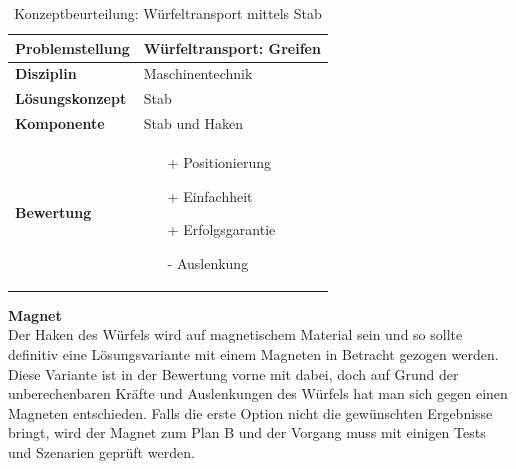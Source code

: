 \documentclass[../../main.tex]{subfiles}
\begin{document}
\begin{flushleft}
    \begin{table}[h]
    \begin{tabular}{ | l | p{11cm} |}
    \hline
    \textbf{Problemstellung} & Würfeltransport: Greifen \\ \hline
    \textbf{Disziplin} & Maschinentechnik \\ \hline
    \textbf{Lösungskonzept} &  Stab \\ \hline
    \textbf{Komponente} & Stab und Haken \\ \hline
    \textbf{Bewertung} &  \begin{itemize}
                            \item[+] Positionierung
                            \item[+] Einfachheit
                            \item[+] Erfolgsgarantie 
                            \item[-] Auslenkung
                          \end{itemize} \\ \hline
    \end{tabular}
    \caption{Konzeptbeurteilung: Würfeltransport mittels Stab}
    \label{tab:stab}
\end{table}
\end{flushleft}

\textbf{Magnet}\\
 Der Haken des Würfels wird auf magnetischem Material sein und so sollte definitiv eine Lösungsvariante mit einem Magneten in Betracht gezogen werden. Diese Variante ist in der Bewertung vorne mit dabei, doch auf Grund der unberechenbaren Kräfte und Auslenkungen des Würfels hat man sich gegen einen Magneten entschieden. Falls die erste Option nicht die gewünschten Ergebnisse bringt, wird der Magnet zum Plan B und der Vorgang muss mit einigen Tests und Szenarien geprüft werden.

\end{document}
